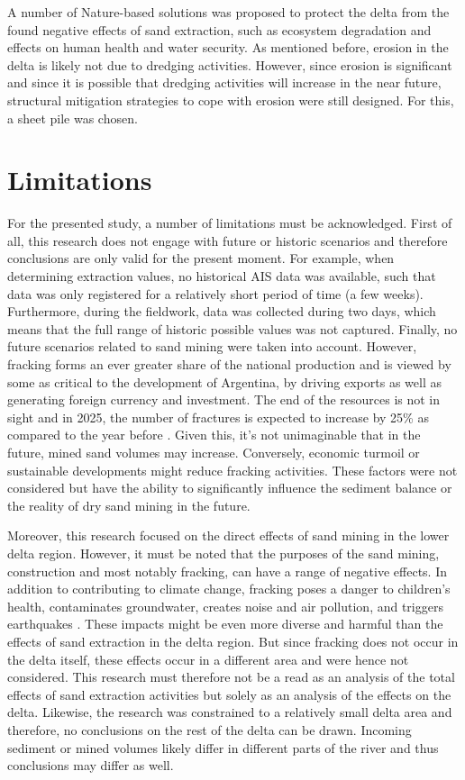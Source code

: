 A number of Nature-based solutions was proposed to protect the delta from the found negative effects of sand extraction, such as ecosystem degradation and effects on human health and water security. As mentioned before, erosion in the delta is likely not due to dredging activities. However, since erosion is significant and since it is possible that dredging activities will increase in the near future, structural mitigation strategies to cope with erosion were still designed. For this, a sheet pile was chosen.

\section{Limitations}
For the presented study, a number of limitations must be acknowledged. First of all, this research does not engage with future or historic scenarios and therefore conclusions are only valid for the present moment. For example, when determining extraction values, no historical AIS data was available, such that data was only registered for a relatively short period of time (a few weeks). Furthermore, during the fieldwork, data was collected during two days, which means that the full range of historic possible values was not captured. Finally, no future scenarios related to sand mining were taken into account. However, fracking forms an ever greater share of the national production and is viewed by some as critical to the development of Argentina, by driving exports as well as generating foreign currency and investment. The end of the resources is not in sight and in 2025, the number of fractures is expected to increase by 25\% as compared to the year before \autocite{barnedaFrackingVacaMuerta2025}. Given this, it's not unimaginable that in the future, mined sand volumes may increase. Conversely, economic turmoil or sustainable developments might reduce fracking activities. These factors were not considered but have the ability to significantly influence the sediment balance or the reality of dry sand mining in the future.

Moreover, this research focused on the direct effects of sand mining in the lower delta region. However, it must be noted that the purposes of the sand mining, construction and most notably fracking, can have a range of negative effects. In addition to contributing to climate change, fracking poses a danger to children's health, contaminates groundwater, creates noise and air pollution, and triggers earthquakes \autocite{nussbaumYaleEnvironmentalHealth2024}. These impacts might be even more diverse and harmful than the effects of sand extraction in the delta region. But since fracking does not occur in the delta itself, these effects occur in a different area and were hence not considered. This research must therefore not be a read as an analysis of the total effects of sand extraction activities but solely as an analysis of the effects on the delta. Likewise, the research was constrained to a relatively small delta area and therefore, no conclusions on the rest of the delta can be drawn. Incoming sediment or mined volumes likely differ in different parts of the river and thus conclusions may differ as well.

